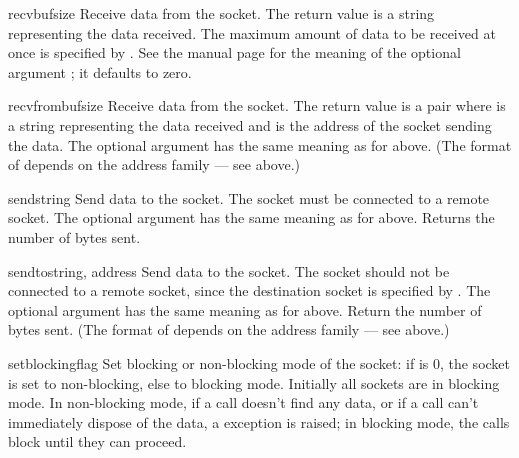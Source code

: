 \begin{methoddesc}[socket]{recv}{bufsize}
Receive data from the socket.  The return value is a string representing
the data received.  The maximum amount of data to be received
at once is specified by .  See the \UNIX{} manual page
 for the meaning of the optional argument
; it defaults to zero.
\end{methoddesc}

\begin{methoddesc}[socket]{recvfrom}{bufsize}
Receive data from the socket.  The return value is a pair
 where  is a string
representing the data received and  is the address of the
socket sending the data.  The optional  argument has the
same meaning as for  above.
(The format of  depends on the address family --- see above.)
\end{methoddesc}

\begin{methoddesc}[socket]{send}{string}
Send data to the socket.  The socket must be connected to a remote
socket.  The optional  argument has the same meaning as for
 above.  Returns the number of bytes sent.
\end{methoddesc}

\begin{methoddesc}[socket]{sendto}{string, address}
Send data to the socket.  The socket should not be connected to a
remote socket, since the destination socket is specified by
.  The optional  argument has the same
meaning as for  above.  Return the number of bytes sent.
(The format of  depends on the address family --- see above.)
\end{methoddesc}

\begin{methoddesc}[socket]{setblocking}{flag}
Set blocking or non-blocking mode of the socket: if  is 0,
the socket is set to non-blocking, else to blocking mode.  Initially
all sockets are in blocking mode.  In non-blocking mode, if a
 call doesn't find any data, or if a
 call can't immediately dispose of the data, a
 exception is raised; in blocking mode, the calls
block until they can proceed.
\end{methoddesc}

